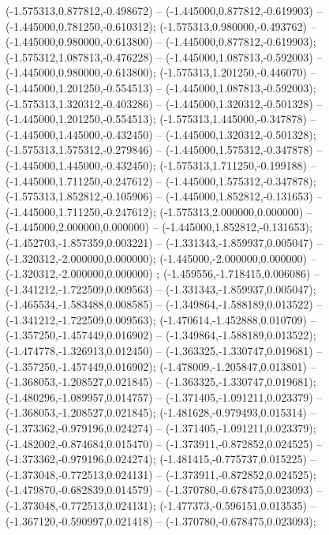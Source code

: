  (-1.575313,0.877812,-0.498672) -- (-1.445000,0.877812,-0.619903) -- (-1.445000,0.781250,-0.610312);
 (-1.575313,0.980000,-0.493762) -- (-1.445000,0.980000,-0.613800) -- (-1.445000,0.877812,-0.619903);
 (-1.575312,1.087813,-0.476228) -- (-1.445000,1.087813,-0.592003) -- (-1.445000,0.980000,-0.613800);
 (-1.575313,1.201250,-0.446070) -- (-1.445000,1.201250,-0.554513) -- (-1.445000,1.087813,-0.592003);
 (-1.575313,1.320312,-0.403286) -- (-1.445000,1.320312,-0.501328) -- (-1.445000,1.201250,-0.554513);
 (-1.575313,1.445000,-0.347878) -- (-1.445000,1.445000,-0.432450) -- (-1.445000,1.320312,-0.501328);
 (-1.575313,1.575312,-0.279846) -- (-1.445000,1.575312,-0.347878) -- (-1.445000,1.445000,-0.432450);
 (-1.575313,1.711250,-0.199188) -- (-1.445000,1.711250,-0.247612) -- (-1.445000,1.575312,-0.347878);
 (-1.575313,1.852812,-0.105906) -- (-1.445000,1.852812,-0.131653) -- (-1.445000,1.711250,-0.247612);
 (-1.575313,2.000000,0.000000) -- (-1.445000,2.000000,0.000000) -- (-1.445000,1.852812,-0.131653);
 (-1.452703,-1.857359,0.003221) -- (-1.331343,-1.859937,0.005047) -- (-1.320312,-2.000000,0.000000);
 (-1.445000,-2.000000,0.000000) -- (-1.320312,-2.000000,0.000000) ;
 (-1.459556,-1.718415,0.006086) -- (-1.341212,-1.722509,0.009563) -- (-1.331343,-1.859937,0.005047);
 (-1.465534,-1.583488,0.008585) -- (-1.349864,-1.588189,0.013522) -- (-1.341212,-1.722509,0.009563);
 (-1.470614,-1.452888,0.010709) -- (-1.357250,-1.457449,0.016902) -- (-1.349864,-1.588189,0.013522);
 (-1.474778,-1.326913,0.012450) -- (-1.363325,-1.330747,0.019681) -- (-1.357250,-1.457449,0.016902);
 (-1.478009,-1.205847,0.013801) -- (-1.368053,-1.208527,0.021845) -- (-1.363325,-1.330747,0.019681);
 (-1.480296,-1.089957,0.014757) -- (-1.371405,-1.091211,0.023379) -- (-1.368053,-1.208527,0.021845);
 (-1.481628,-0.979493,0.015314) -- (-1.373362,-0.979196,0.024274) -- (-1.371405,-1.091211,0.023379);
 (-1.482002,-0.874684,0.015470) -- (-1.373911,-0.872852,0.024525) -- (-1.373362,-0.979196,0.024274);
 (-1.481415,-0.775737,0.015225) -- (-1.373048,-0.772513,0.024131) -- (-1.373911,-0.872852,0.024525);
 (-1.479870,-0.682839,0.014579) -- (-1.370780,-0.678475,0.023093) -- (-1.373048,-0.772513,0.024131);
 (-1.477373,-0.596151,0.013535) -- (-1.367120,-0.590997,0.021418) -- (-1.370780,-0.678475,0.023093);
